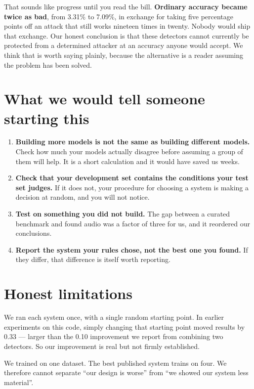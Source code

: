 \documentclass[11pt,a4paper]{article}
\begin{document}
That sounds like progress until you read the bill. \textbf{Ordinary accuracy became twice as bad},
from 3.31\% to 7.09\%, in exchange for taking five percentage points off an attack that still works
nineteen times in twenty. Nobody would ship that exchange. Our honest conclusion is that these
detectors cannot currently be protected from a determined attacker at an accuracy anyone would
accept. We think that is worth saying plainly, because the alternative is a reader assuming the
problem has been solved.

\section{What we would tell someone starting this}

\begin{enumerate}\itemsep3pt
\item \textbf{Building more models is not the same as building different models.} Check how much
your models actually disagree before assuming a group of them will help. It is a short calculation
and it would have saved us weeks.
\item \textbf{Check that your development set contains the conditions your test set judges.} If it
does not, your procedure for choosing a system is making a decision at random, and you will not
notice.
\item \textbf{Test on something you did not build.} The gap between a curated benchmark and found
audio was a factor of three for us, and it reordered our conclusions.
\item \textbf{Report the system your rules chose, not the best one you found.} If they differ, that
difference is itself worth reporting.
\end{enumerate}

\section{Honest limitations}

We ran each system once, with a single random starting point. In earlier experiments on this code,
simply changing that starting point moved results by 0.33 --- larger than the 0.10 improvement we
report from combining two detectors. So our improvement is real but not firmly established.

We trained on one dataset. The best published system trains on four. We therefore cannot separate
``our design is worse'' from ``we showed our system less material''.
\end{document}

